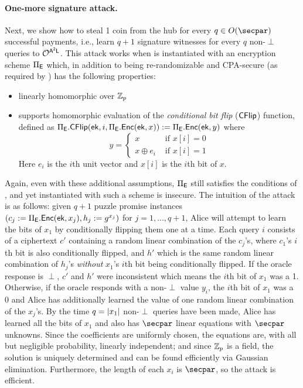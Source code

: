 \paragraph{One-more signature attack.} Next, we show how to steal 1 coin from the hub for every $q \in O(\secpar)$ successful payments, i.e., learn $q+1$ signature witnesses for every $q$ non-$\perp$ queries to $\mathcal{O}^{\sf A^2L}$. This attack works when \AAL is instantiated with an encryption scheme $\Pi_{\mathsf{E}}$ which, in addition to being re-randomizable and CPA-secure (as required by ) has the following properties:
\begin{itemize}
    \item linearly homomorphic over $\mathbb{Z}_p$
    \item supports homomorphic evaluation of the \emph{conditional bit flip} ($\sf CFlip$) function, defined as $\Pi_{\mathsf{E}}.\mathsf{CFlip}(\mathsf{ek}, i, \Pi_{\mathsf{E}}.\mathsf{Enc}(\mathsf{ek}, x)) := \Pi_{\mathsf{E}}.\mathsf{Enc}(\mathsf{ek}, y)$ where
    \[
        y = \begin{cases} 
            x &\text{ if } x[i] = 0\\ 
            x \oplus e_i &\text{ if } x[i] = 1
        \end{cases}
    \]
    Here $e_i$ is the $i$th unit vector and $x[i]$ is the $i$th bit of $x$.
\end{itemize}
Again, even with these additional assumptions, $\Pi_{\mathsf{E}}$ still satisfies the conditions of , and yet \AAL instantiated with such a scheme is insecure. The intuition of the attack is as follows: given $q+1$ puzzle promise instances $(c_j := \Pi_{\mathsf{E}}.\mathsf{Enc}(\mathsf{ek}, x_j), h_j := g^{x_j})$ for $j = 1, \dots, q+1$, Alice will attempt to learn the bits of $x_1$ by conditionally flipping them one at a time. Each query $i$ consists of a ciphertext $c'$ containing a random linear combination of the $c_j$'s, where $c_1$'s $i$th bit is also conditionally flipped, and $h'$ which is the same random linear combination of $h_j$'s \emph{without} $x_1$'s $i$th bit being conditionally flipped. If the oracle response is $\perp$, $c'$ and $h'$ were inconsistent which means the $i$th bit of $x_1$ was a 1. Otherwise, if the oracle responds with a non-$\perp$ value $y_i$, the $i$th bit of $x_1$ was a 0 and Alice has additionally learned the value of one random linear combination of the $x_j$'s. By the time $q = \lvert x_1 \rvert$ non-$\perp$ queries have been made, Alice has learned all the bits of $x_1$ and also has $\secpar$ linear equations with $\secpar$ unknowns. Since the coefficients are uniformly chosen, the equations are, with all but negligible probability, linearly independent; and since $\mathbb{Z}_p$ is a field, the solution is uniquely determined and can be found efficiently via Gaussian elimination. Furthermore, the length of each $x_i$ is $\secpar$, so the attack is efficient.

